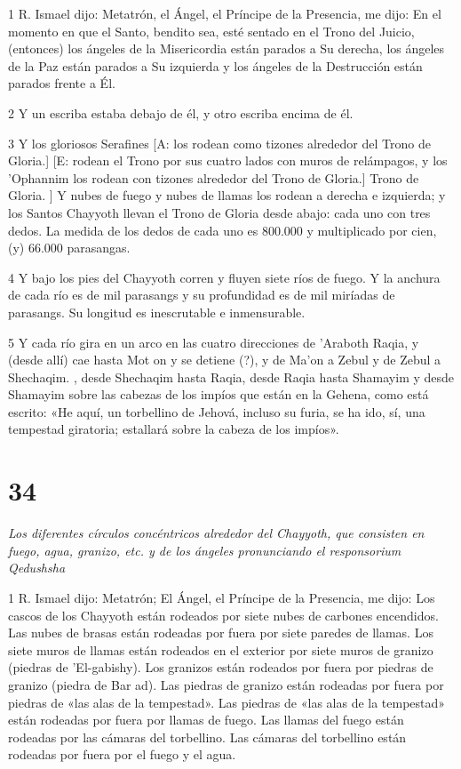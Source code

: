 \par 1 R. Ismael dijo: Metatrón, el Ángel, el Príncipe de la Presencia, me dijo: En el momento en que el Santo, bendito sea, esté sentado en el Trono del Juicio, (entonces) los ángeles de la Misericordia están parados a Su derecha, los ángeles de la Paz están parados a Su izquierda y los ángeles de la Destrucción están parados frente a Él.

\par 2 Y un escriba estaba debajo de él, y otro escriba encima de él.

\par 3 Y los gloriosos Serafines [A: los rodean como tizones alrededor del Trono de Gloria.] [E: rodean el Trono por sus cuatro lados con muros de relámpagos, y los 'Ophannim los rodean con tizones alrededor del Trono de Gloria.] Trono de Gloria. ] Y nubes de fuego y nubes de llamas los rodean a derecha e izquierda; y los Santos Chayyoth llevan el Trono de Gloria desde abajo: cada uno con tres dedos. La medida de los dedos de cada uno es 800.000 y multiplicado por cien, (y) 66.000 parasangas.

\par 4 Y bajo los pies del Chayyoth corren y fluyen siete ríos de fuego. Y la anchura de cada río es de mil parasangs y su profundidad es de mil miríadas de parasangs. Su longitud es inescrutable e inmensurable.

\par 5 Y cada río gira en un arco en las cuatro direcciones de 'Araboth Raqia, y (desde allí) cae hasta Mot on y se detiene (?), y de Ma'on a Zebul y de Zebul a Shechaqim. , desde Shechaqim hasta Raqia, desde Raqia hasta Shamayim y desde Shamayim sobre las cabezas de los impíos que están en la Gehena, como está escrito: «He aquí, un torbellino de Jehová, incluso su furia, se ha ido, sí, una tempestad giratoria; estallará sobre la cabeza de los impíos».

\chapter{34}

\par \textit{Los diferentes círculos concéntricos alrededor del Chayyoth, que consisten en fuego, agua, granizo, etc. y de los ángeles pronunciando el responsorium Qedushsha}

\par 1 R. Ismael dijo: Metatrón; El Ángel, el Príncipe de la Presencia, me dijo: Los cascos de los Chayyoth están rodeados por siete nubes de carbones encendidos. Las nubes de brasas están rodeadas por fuera por siete paredes de llamas. Los siete muros de llamas están rodeados en el exterior por siete muros de granizo (piedras de 'El-gabishy). Los granizos están rodeados por fuera por piedras de granizo (piedra de Bar ad). Las piedras de granizo están rodeadas por fuera por piedras de «las alas de la tempestad». Las piedras de «las alas de la tempestad» están rodeadas por fuera por llamas de fuego. Las llamas del fuego están rodeadas por las cámaras del torbellino. Las cámaras del torbellino están rodeadas por fuera por el fuego y el agua.

